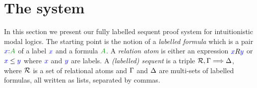 %
%
\section{The system}\label{sec:system}

In this section we present our fully labelled sequent proof system
for intuitionistic modal logics. The starting point is the notion of a
\emph{labelled formula} which is a pair $\labels xA$ of a label ${\color{blue}{x}}$ and a formula $\fm A$. 
A \emph{relation atom} is either an expression
${\color{blue}{x}}R{\color{blue}{y}}$ or ${\color{blue}{x}}\le{{\color{blue}{y}}}$ where ${\color{blue}{x}}$ and ${\color{blue}{y}}$ are labels. 
%
A \emph{(labelled) sequent} is a triple $\mathcal{R} , \Gamma \Longrightarrow \Delta$,
where $\mathcal{R}$ is a set of relational atoms
and $\Gamma$ and $\Delta$ are
multi-sets of labelled formulas, all written as lists, separated by commas.

